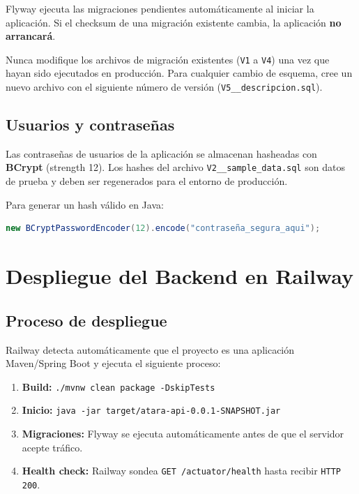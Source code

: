 \documentclass[11pt, a4paper]{article}
\begin{document}
Flyway ejecuta las migraciones pendientes automáticamente al iniciar la aplicación. Si el checksum de una migración existente cambia, la aplicación \textbf{no arrancará}.

\begin{warningbox}
  Nunca modifique los archivos de migración existentes (\texttt{V1} a \texttt{V4}) una vez que hayan sido ejecutados en producción. Para cualquier cambio de esquema, cree un nuevo archivo con el siguiente número de versión (\texttt{V5\_\_descripcion.sql}).
\end{warningbox}

\subsection{Usuarios y contraseñas}

Las contraseñas de usuarios de la aplicación se almacenan hasheadas con \textbf{BCrypt} (strength 12). Los hashes del archivo \texttt{V2\_\_sample\_data.sql} son datos de prueba y deben ser regenerados para el entorno de producción.

Para generar un hash válido en Java:
\begin{lstlisting}[language=Java]
new BCryptPasswordEncoder(12).encode("contraseña_segura_aqui");
\end{lstlisting}

\section{Despliegue del Backend en Railway}

\subsection{Proceso de despliegue}

Railway detecta automáticamente que el proyecto es una aplicación Maven/Spring Boot y ejecuta el siguiente proceso:

\begin{enumerate}
  \item \textbf{Build:} \texttt{./mvnw clean package -DskipTests}
  \item \textbf{Inicio:} \texttt{java -jar target/atara-api-0.0.1-SNAPSHOT.jar}
  \item \textbf{Migraciones:} Flyway se ejecuta automáticamente antes de que el servidor acepte tráfico.
  \item \textbf{Health check:} Railway sondea \texttt{GET /actuator/health} hasta recibir \texttt{HTTP 200}.
\end{enumerate}
\end{document}
